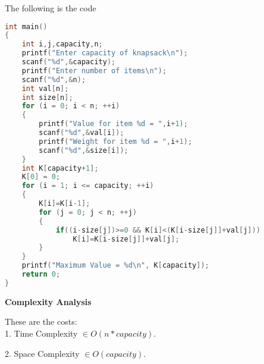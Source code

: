 \documentclass{article}
\begin{document}
The following is the code
\begin{lstlisting}[language=c, caption=knapsack]
int main()
{
    int i,j,capacity,n;
    printf("Enter capacity of knapsack\n");
    scanf("%d",&capacity);
    printf("Enter number of items\n");
    scanf("%d",&n);
    int val[n];
    int size[n];
    for (i = 0; i < n; ++i)
    {
        printf("Value for item %d = ",i+1);
        scanf("%d",&val[i]);
        printf("Weight for item %d = ",i+1);
        scanf("%d",&size[i]);
    }
    int K[capacity+1];
    K[0] = 0;
    for (i = 1; i <= capacity; ++i)
    {
        K[i]=K[i-1];
        for (j = 0; j < n; ++j)
        {
            if((i-size[j])>=0 && K[i]<(K[i-size[j]]+val[j]))
                K[i]=K[i-size[j]]+val[j];
        }
    }
    printf("Maximum Value = %d\n", K[capacity]);
    return 0;
}
\end{lstlisting}

\textbf{Complexity Analysis}

These are the costs: \\

1. Time Complexity  $\in O(n*capacity)$.

2. Space Complexity  $\in O(capacity)$.
\end{document}
